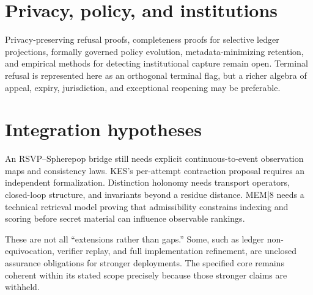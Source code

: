 \documentclass[11pt,openany]{book}
\begin{document}
\section{Privacy, policy, and institutions}
Privacy-preserving refusal proofs, completeness proofs for selective ledger
projections, formally governed policy evolution, metadata-minimizing retention,
and empirical methods for detecting institutional capture remain open.
Terminal refusal is represented here as an orthogonal terminal flag, but a
richer algebra of appeal, expiry, jurisdiction, and exceptional reopening may
be preferable.

\section{Integration hypotheses}
An RSVP--Spherepop bridge still needs explicit continuous-to-event observation
maps and consistency laws. KES's per-attempt contraction proposal requires an
independent formalization. Distinction holonomy needs transport operators,
closed-loop structure, and invariants beyond a residue distance. MEM|8 needs a
technical retrieval model proving that admissibility constrains indexing and
scoring before secret material can influence observable rankings.

These are not all “extensions rather than gaps.” Some, such as ledger
non-equivocation, verifier replay, and full implementation refinement, are
unclosed assurance obligations for stronger deployments. The specified core
remains coherent within its stated scope precisely because those stronger
claims are withheld.

\backmatter
\end{document}
